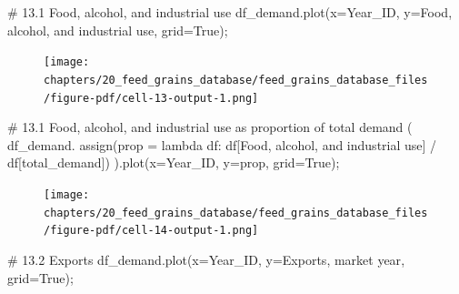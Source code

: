 \documentclass[
  letterpaper,
  DIV=11,
  numbers=noendperiod]{scrreprt}
\newenvironment{Shaded}{\begin{snugshade}}{\end{snugshade}}
\newcommand{\CommentTok}[1]{\textcolor[rgb]{0.37,0.37,0.37}{#1}}
\newcommand{\KeywordTok}[1]{\textcolor[rgb]{0.00,0.23,0.31}{#1}}
\newcommand{\NormalTok}[1]{\textcolor[rgb]{0.00,0.23,0.31}{#1}}
\newcommand{\OperatorTok}[1]{\textcolor[rgb]{0.37,0.37,0.37}{#1}}
\newcommand{\StringTok}[1]{\textcolor[rgb]{0.13,0.47,0.30}{#1}}
\newcommand{\VariableTok}[1]{\textcolor[rgb]{0.07,0.07,0.07}{#1}}
\begin{document}
\begin{Shaded}
\begin{Highlighting}[]
\CommentTok{\# 13.1 Food, alcohol, and industrial use}
\NormalTok{df\_demand.plot(x}\OperatorTok{=}\StringTok{\textquotesingle{}Year\_ID\textquotesingle{}}\NormalTok{, y}\OperatorTok{=}\StringTok{\textquotesingle{}Food, alcohol, and industrial use\textquotesingle{}}\NormalTok{, grid}\OperatorTok{=}\VariableTok{True}\NormalTok{)}\OperatorTok{;}
\end{Highlighting}
\end{Shaded}

\begin{figure}[H]

{\centering \texttt{[image: chapters/20\_feed\_grains\_database/feed\_grains\_database\_files/figure-pdf/cell-13-output-1.png]}

}

\end{figure}

\begin{Shaded}
\begin{Highlighting}[]
\CommentTok{\# 13.1 Food, alcohol, and industrial use as proportion of total demand}
\NormalTok{(}
\NormalTok{df\_demand.}
\NormalTok{    assign(prop }\OperatorTok{=} \KeywordTok{lambda}\NormalTok{ df: df[}\StringTok{\textquotesingle{}Food, alcohol, and industrial use\textquotesingle{}}\NormalTok{] }\OperatorTok{/}\NormalTok{ df[}\StringTok{\textquotesingle{}total\_demand\textquotesingle{}}\NormalTok{])}
\NormalTok{).plot(x}\OperatorTok{=}\StringTok{\textquotesingle{}Year\_ID\textquotesingle{}}\NormalTok{, y}\OperatorTok{=}\StringTok{\textquotesingle{}prop\textquotesingle{}}\NormalTok{, grid}\OperatorTok{=}\VariableTok{True}\NormalTok{)}\OperatorTok{;}
\end{Highlighting}
\end{Shaded}

\begin{figure}[H]

{\centering \texttt{[image: chapters/20\_feed\_grains\_database/feed\_grains\_database\_files/figure-pdf/cell-14-output-1.png]}

}

\end{figure}

\begin{Shaded}
\begin{Highlighting}[]
\CommentTok{\# 13.2 Exports}
\NormalTok{df\_demand.plot(x}\OperatorTok{=}\StringTok{\textquotesingle{}Year\_ID\textquotesingle{}}\NormalTok{, y}\OperatorTok{=}\StringTok{\textquotesingle{}Exports, market year\textquotesingle{}}\NormalTok{, grid}\OperatorTok{=}\VariableTok{True}\NormalTok{)}\OperatorTok{;}
\end{Highlighting}
\end{Shaded}
\end{document}
